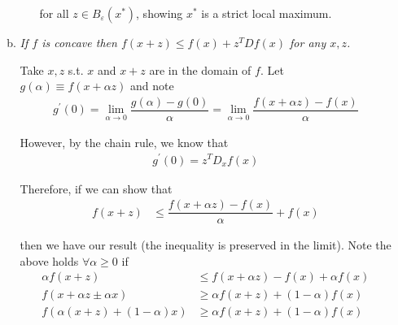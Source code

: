\documentclass{article}
\begin{document}
\begin{enumerate}[1.]
\begin{enumerate}[a)]
\begin{enumerate}[i)]
            for all $z \in B_{\varepsilon}(x^*)$, showing $x^{*}$ is a strict local maximum.
        \end{enumerate}

      \item \textit{If $f$ is concave then $f(x + z) \le f(x) + z^T Df(x)$ for any $x, z$.}

        \solution Take $x, z$ s.t. $x$ and $x + z$ are in the domain of $f$. Let $g(\alpha) \equiv f(x + \alpha z)$ and note
          \begin{align*}
            g^\prime(0)
            =
            \lim_{\alpha \to 0}
            \dfrac{g(\alpha) - g(0)}{\alpha}
            =
            \lim_{\alpha \to 0}
            \dfrac{f(x + \alpha z) - f(x)}{\alpha}
          \end{align*}

          However, by the chain rule, we know that
          \begin{align*}
            g^\prime(0)
            =
            z^T D_x f(x)
          \end{align*}

          Therefore, if we can show that
          \begin{align*}
            f(x + z)
            &
            \le
            \dfrac{f(x + \alpha z) - f(x)}{\alpha} + f(x)
          \end{align*}

          then we have our result (the inequality is preserved in the limit). Note the above holds $\forall \alpha \ge 0$ if
          \begin{align*}
            \alpha f(x + z)
            &
            \le
            f(x + \alpha z) - f(x) + \alpha f(x)
            \\
            f(x + \alpha z \pm \alpha x)
            &
            \ge
            \alpha f(x + z) + (1 - \alpha) f(x)
            \\
            f(\alpha (x + z) + (1 - \alpha) x)
            &
            \ge
            \alpha f(x + z) + (1 - \alpha) f(x)
          \end{align*}


\end{enumerate}
\end{enumerate}
\end{document}
